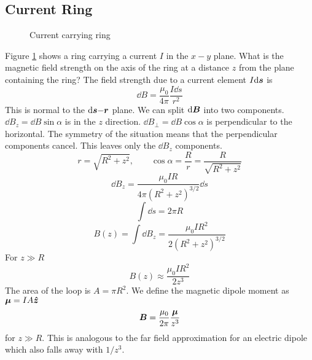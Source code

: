 \documentclass{article}
\begin{document}
    \subsection{Current Ring}
    \begin{figure}[ht]
        \centering
        \caption{Current carrying ring}
        \label{fig:current ring}
    \end{figure}
    Figure \ref{fig:current ring} shows a ring carrying a current \(I\) in the \(x{-}y\) plane.
    What is the magnetic field strength on the axis of the ring at a distance \(z\) from the plane containing the ring?
    The field strength due to a current element \(I\dd\bm{s}\) is
    \[\dd B = \frac{\mu_0}{4\pi}\frac{I\dd s}{r^2}\]
    This is normal to the \(\dd\bm{s}{-}\bm{r}\) plane.
    We can split \(\dd\bm{B}\) into two components.
    \(\dd B_z = \dd B\sin\alpha\) is in the \(z\) direction.
    \(\dd B_\perp = \dd B\cos\alpha\) is perpendicular to the horizontal.
    The symmetry of the situation means that the perpendicular components cancel.
    This leaves only the \(\dd B_z\) components.
    \[r = \sqrt{R^2 + z^2},\qquad\cos\alpha = \frac{R}{r} = \frac{R}{\sqrt{R^2 + z^2}}\]
    \[\dd B_z = \frac{\mu_0 IR}{4\pi(R^2 + z^2)^{3/2}}\dd s\]
    \[\int \dd s = 2\pi R\]
    \[B(z) = \int\dd B_z = \frac{\mu_0IR^2}{2(R^2 + z^2)^{3/2}}\]
    For \(z\gg R\)
    \[B(z)\approx \frac{\mu_0 IR^2}{2z^3}\]
    The area of the loop is \(A = \pi R^2\).
    We define the magnetic dipole moment as \(\bm{\mu} = IA\bm{\hat{z}}\)
    \[\bm{B} = \frac{\mu_0}{2\pi}\frac{\bm{\mu}}{z^3}\]
    for \(z\gg R\).
    This is analogous to the far field approximation for an electric dipole which also falls away with \(1/z^3\).
    
\end{document}
